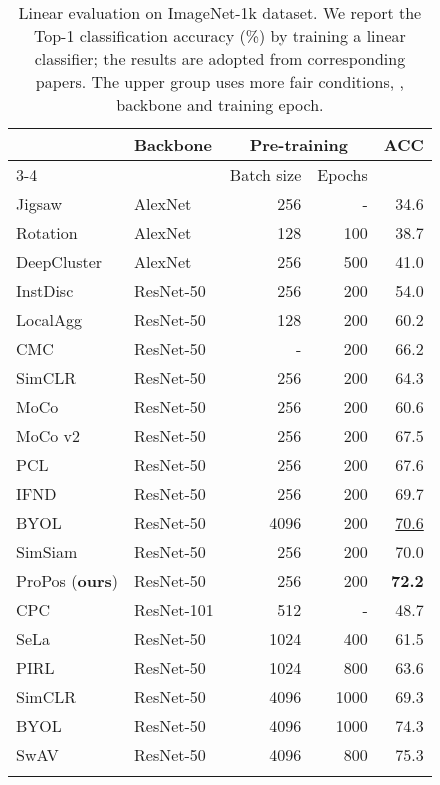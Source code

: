\begin{table}[t]
  \centering
  \caption{
    Linear evaluation on ImageNet-1k dataset. We report the Top-1 classification accuracy (\%) by training a linear classifier; the results are adopted from corresponding papers. The upper group uses more fair conditions, \eg, backbone and training epoch.
    }
  \label{tab:imagenet_linear_classifier}
  \begin{tabular*}{1\linewidth}{@{\extracolsep{\fill}}llrrr}
  \shline
  \multirow{3}{*}{\textbf{Method}} & \multirow{3}{*}{\textbf{Backbone}} & \multicolumn{2}{c}{\textbf{Pre-training}}   & \multirow{3}{*}{\textbf{ACC}}     \\
  \cmidrule{3-4}
    &    & Batch size& Epochs    &      \\
  \midrule
  Jigsaw~\cite{noroozi2016unsupervised}   & AlexNet   & 256  & -    & 34.6 \\
  Rotation~\cite{gidaris2018unsupervised} & AlexNet   & 128  & 100  & 38.7 \\
  DeepCluster~\cite{caron2018deep}             & AlexNet   & 256  & 500  & 41.0 \\
  InstDisc~\cite{wu2018unsupervised} & ResNet-50 & 256  & 200  & 54.0 \\
  LocalAgg~\cite{zhuang2019local} & ResNet-50 & 128  & 200  & 60.2 \\
  CMC~\cite{tian2020contrastive} & ResNet-50 & -    & 200  & 66.2 \\
  SimCLR~\cite{chen2020simple}   & ResNet-50 & 256  & 200  & 64.3 \\
  MoCo~\cite{he2020momentum} & ResNet-50 & 256  & 200  & 60.6 \\
  MoCo v2~\cite{chen2020improved}   & ResNet-50  & 256 & 200  & 67.5 \\
  PCL~\cite{li2020prototypical}    & ResNet-50   & 256   & 200  & 67.6 \\
  IFND~\cite{chen2021incremental}     & ResNet-50  & 256  & 200  & 69.7 \\
  BYOL~\cite{albrecht2020}     & ResNet-50  & 4096  & 200  & \underline{70.6} \\
  SimSiam~\cite{chen2021exploring}     & ResNet-50  & 256  & 200  & 70.0 \\
  ProPos (\textbf{ours})           & ResNet-50 & 256  & 200  & \textbf{72.2}    \\
  \midrule
  CPC~\cite{oord2018representation} & ResNet-101& 512  & -    & 48.7 \\
  SeLa~\cite{asano2019self} & ResNet-50 & 1024 & 400  & 61.5 \\
  PIRL~\cite{misra2020self} & ResNet-50 & 1024 & 800  & 63.6 \\
  SimCLR~\cite{chen2020simple}   & ResNet-50 & 4096 & 1000 & 69.3 \\
  BYOL~\cite{albrecht2020} & ResNet-50 & 4096 & 1000 & 74.3 \\
  SwAV~\cite{caron2020unsupervised} & ResNet-50 & 4096 & 800  & 75.3 \\
  \shline
  \end{tabular*}
\end{table}

